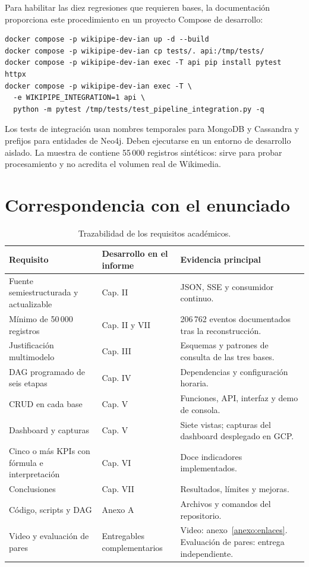 Para habilitar las diez regresiones que requieren bases, la documentación proporciona este procedimiento en un proyecto Compose de desarrollo:
\par\noindent\begin{minipage}{\linewidth}
\begin{lstlisting}
docker compose -p wikipipe-dev-ian up -d --build
docker compose -p wikipipe-dev-ian cp tests/. api:/tmp/tests/
docker compose -p wikipipe-dev-ian exec -T api pip install pytest httpx
docker compose -p wikipipe-dev-ian exec -T \
  -e WIKIPIPE_INTEGRATION=1 api \
  python -m pytest /tmp/tests/test_pipeline_integration.py -q
\end{lstlisting}
\end{minipage}\par

Los tests de integración usan nombres temporales para MongoDB y Cassandra y prefijos para entidades de Neo4j. Deben ejecutarse en un entorno de desarrollo aislado. La muestra de  contiene 55\,000 registros sintéticos: sirve para probar procesamiento y no acredita el volumen real de Wikimedia.

\section{Correspondencia con el enunciado}
\begin{table}[H]\centering\small{}\renewcommand{\arraystretch}{1.2}
\begin{tabularx}{\textwidth}{P{3.8cm}P{2.3cm}Y}
\toprule
Requisito & Desarrollo en el informe & Evidencia principal \\
\midrule
Fuente semiestructurada y actualizable & Cap. II & JSON, SSE y consumidor continuo. \\
Mínimo de 50\,000 registros & Cap. II y VII & 206\,762 eventos documentados tras la reconstrucción. \\
Justificación multimodelo & Cap. III & Esquemas y patrones de consulta de las tres bases. \\
DAG programado de seis etapas & Cap. IV & Dependencias y configuración horaria. \\
CRUD en cada base & Cap. V & Funciones, API, interfaz y demo de consola. \\
Dashboard y capturas & Cap. V & Siete vistas; capturas del dashboard desplegado en GCP. \\
Cinco o más KPIs con fórmula e interpretación & Cap. VI & Doce indicadores implementados. \\
Conclusiones & Cap. VII & Resultados, límites y mejoras. \\
Código, scripts y DAG & Anexo A & Archivos y comandos del repositorio. \\
Video y evaluación de pares & Entregables complementarios & Video: anexo~\ref{anexo:enlaces}. Evaluación de pares: entrega independiente. \\
\bottomrule
\end{tabularx}
\caption{Trazabilidad de los requisitos académicos.}
\end{table}

